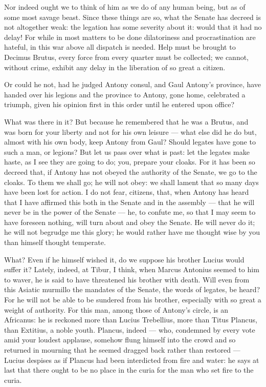  Nor indeed ought we to think of him as we do of any human being, but as of some most savage beast. Since these things are so, what the Senate has decreed is not altogether weak: the legation has some severity about it: would that it had no delay! For while in most matters to be done dilatoriness and procrastination are hateful, in this war above all dispatch is needed. Help must be brought to Decimus Brutus, every force from every quarter must be collected; we cannot, without crime, exhibit any delay in the liberation of so great a citizen.

 Or could he not, had he judged Antony consul, and Gaul Antony's province, have handed over his legions and the province to Antony, gone home, celebrated a triumph, given his opinion first in this order until he entered upon office?

 What was there in it? But because he remembered that he was a Brutus, and was born for your liberty and not for his own leisure --- what else did he do but, almost with his own body, keep Antony from Gaul? Should legates have gone to such a man, or legions? But let us pass over what is past: let the legates make haste, as I see they are going to do; you, prepare your cloaks. For it has been so decreed that, if Antony has not obeyed the authority of the Senate, we go to the cloaks. To them we shall go; he will not obey: we shall lament that so many days have been lost for action. I do not fear, citizens, that, when Antony has heard that I have affirmed this both in the Senate and in the assembly --- that he will never be in the power of the Senate --- he, to confute me, so that I may seem to have foreseen nothing, will turn about and obey the Senate. He will never do it; he will not begrudge me this glory; he would rather have me thought wise by you than himself thought temperate.

 What? Even if he himself wished it, do we suppose his brother Lucius would suffer it? Lately, indeed, at Tibur, I think, when Marcus Antonius seemed to him to waver, he is said to have threatened his brother with death. Will even from this Asiatic murmillo the mandates of the Senate, the words of legates, be heard? For he will not be able to be sundered from his brother, especially with so great a weight of authority. For this man, among those of Antony's circle, is an Africanus: he is reckoned more than Lucius Trebellius, more than Titus Plancus, than Extitius, a noble youth. Plancus, indeed --- who, condemned by every vote amid your loudest applause, somehow flung himself into the crowd and so returned in mourning that he seemed dragged back rather than restored --- Lucius despises as if Plancus had been interdicted from fire and water: he says at last that there ought to be no place in the curia for the man who set fire to the curia.

